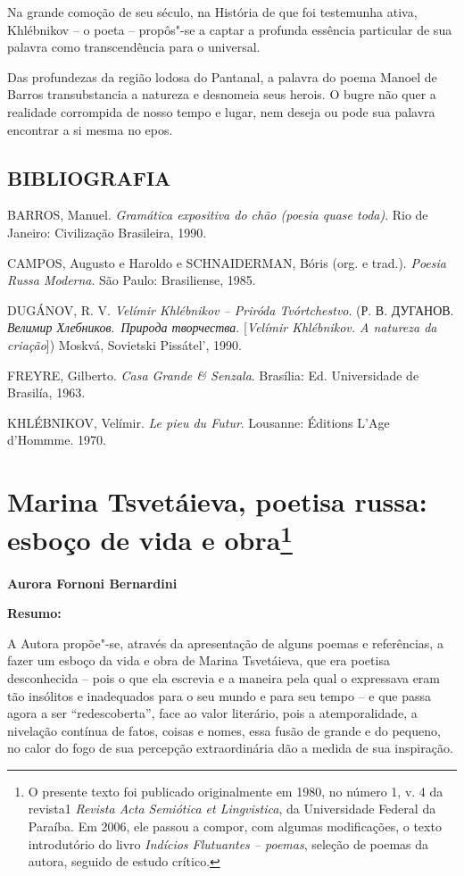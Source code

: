 Na grande comoção de seu século, na História de que foi testemunha
ativa, Khlébnikov -- o poeta -- propôs"-se a captar a profunda essência
particular de sua palavra como transcendência para o universal.

Das profundezas da região lodosa do Pantanal, a palavra do poema Manoel
de Barros transubstancia a natureza e desnomeia seus herois. O bugre não
quer a realidade corrompida de nosso tempo e lugar, nem deseja ou pode
sua palavra encontrar a si mesma no epos.

\section{BIBLIOGRAFIA}

BARROS, Manuel. \emph{Gramática expositiva do chão (poesia quase toda)}.
Rio de Janeiro: Civilização Brasileira, 1990.

CAMPOS, Augusto e Haroldo e SCHNAIDERMAN, Bóris (org. e trad.).
\emph{Poesia Russa Moderna}. São Paulo: Brasiliense, 1985.

DUGÁNOV, R. V. \emph{Velímir Khlébnikov -- Priróda Tvórtchestvo}. (Р. В.
ДУГАНОВ. \emph{Велимир Хлебников}.~\emph{Природа творчества}.
{[}\emph{Velímir Khlébnikov. A natureza da criação}{]}) Moskvá,
Sovietski Pissátel', 1990.

FREYRE, Gilberto. \emph{Casa Grande \& Senzala}. Brasília: Ed.
Universidade de Brasilía, 1963.

KHLÉBNIKOV, Velímir. \emph{Le pieu du Futur}. Lousanne: Éditions L'Age
d'Hommme. 1970.

\chapter{Marina Tsvetáieva, poetisa russa: esboço de vida e
obra\footnote{O presente texto foi publicado originalmente em 1980, no
  número 1, v. 4 da revista1 \emph{Revista Acta Semiótica et
  Lingvistica}, da Universidade Federal da Paraíba. Em 2006, ele passou
  a compor, com algumas modificações, o texto introdutório do livro
  \emph{Indícios Flutuantes -- poemas}, seleção de poemas da autora,
  seguido de estudo crítico.}}

\textbf{Aurora Fornoni Bernardini}

\textbf{Resumo: }

A Autora propõe"-se, através da apresentação de alguns poemas e
referências, a fazer um esboço da vida e obra de Marina Tsvetáieva, que
era poetisa desconhecida -- pois o que ela escrevia e a maneira pela
qual o expressava eram tão insólitos e inadequados para o seu mundo e
para seu tempo -- e que passa agora a ser ``redescoberta'', face ao
valor literário, pois a atemporalidade, a nivelação contínua de fatos,
coisas e nomes, essa fusão de grande e do pequeno, no calor do fogo de
sua percepção extraordinária dão a medida de sua inspiração.

